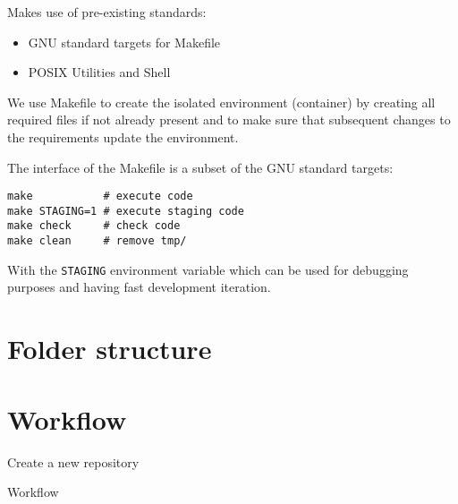 \documentclass[journal]{IEEEtran}
\begin{document}
Makes use of pre-existing standards:
\begin{itemize}
	\item GNU standard targets for Makefile~\cite{stallman1992gnu}
	\item POSIX Utilities and Shell~\cite{lewine1991posix}
\end{itemize}

We use Makefile to create the isolated environment (container) by creating all required files if not already present and to make sure that subsequent changes to the requirements update the environment.

The interface of the Makefile is a subset of the GNU standard targets:
\begin{verbatim}
make           # execute code 
make STAGING=1 # execute staging code 
make check     # check code
make clean     # remove tmp/
\end{verbatim}

With the \texttt{STAGING} environment variable which can be used for debugging purposes and having fast development iteration.

\section{Folder structure}

\section{Workflow}

\begin{algorithm}
	Create a new repository\;
	\Return{}
	\caption{Workflow}
\end{algorithm}



\end{document}
